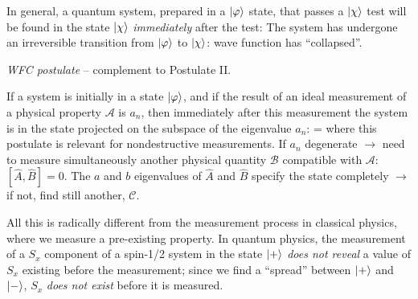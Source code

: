 \documentclass[12pt]{article}
\begin{document}
In general, a quantum system, prepared in a
$\ket{\varphi}$ state, that passes a $\ket{\chi}$ test will be
found in the state $\ket{\chi}$ \emph{immediately} after the test:
\be
\ket{\varphi} 
\ee
The system has undergone an irreversible
transition from $\ket{\varphi}$ to $\ket{\chi}$: wave function has ``collapsed''.

\emph{WFC postulate} -- complement to Postulate II.

If a system is initially in a state $\ket{\varphi}$,
and if the result of an ideal measurement
of a physical property $\mathcal{A}$ is $a_n$, then
immediately after this measurement the
system is in the state projected on the
subspace of the eigenvalue $a_n$:
\be
\ket{\varphi} \to \ket{\psi} = 
\ee
where this postulate is relevant for nondestructive measurements.
If $a_n$ degenerate $\to$ need to measure
simultaneously another physical
quantity $\mathcal{B}$ compatible with
$\mathcal{A}$: $[\hat{A},\hat{B}] = 0$.
The $a$ and $b$ eigenvalues of $\hat{A}$ and $\hat{B}$ specify the state completely $\to$ if not, find still another, $\mathcal{C}$.


All this is radically different from the measurement 
process in classical physics, where we measure a pre-existing property.
In quantum physics, the measurement of
a $S_x$ component of a spin-1/2 system
in the state $\ket{+}$ \emph{does not reveal} a value
of $S_x$ existing before the measurement;
since we find a ``spread'' between $\ket{+}$ and $\ket{-}$,
$S_x$ \emph{does not exist} before it is measured.
\end{document}
